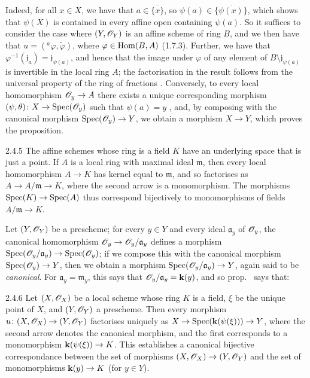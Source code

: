 \documentclass{book}
\begin{document}
Indeed, for all $x\in X$, we have that $a\in\overline{\{x\}}$, so
$\psi(a)\in\overline{\{\psi(x)\}}$, which shows that $\psi(X)$ is contained in
every affine open containing $\psi(a)$. So it suffices to consider the case
where $(Y,\mathscr{O}_Y)$ is an affine scheme of ring $B$, and we then have that
$u=(^a\varphi,\tilde{\varphi})$, where $\varphi\in{\mathop{\mathrm{Hom}}\nolimits}(B,A)$ (1.7.3).  Further,
we have that $\varphi^{-1}(\mathfrak{j}_a)=\mathfrak{j}_{\psi(a)}$, and hence
that the image under $\varphi$ of any element of
$B\setminus\mathfrak{j}_{\psi(a)}$ is invertible in the local ring $A$; the
factorisation in the result follows from the universal property of the ring of
fractions . Conversely, to every local homomorphism
$\mathscr{O}_y\to A$ there exists a unique corresponding morphism
$(\psi,\theta)\colon X\to{\mathop{\mathrm{Spec}}\nolimits}(\mathscr{O}_y)$ such that $\psi(a)=y$ , and,
by composing with the canonical morphism ${\mathop{\mathrm{Spec}}\nolimits}(\mathscr{O}_y)\to Y$, we obtain a morphism
$X\to Y$, which proves the proposition.
    
\begin{env}{2.4.5}
\label{env-1.2.4.5}
The affine schemes whose ring is a field $K$ have an
underlying space that is just a point. If $A$ is a local ring with maximal
ideal $\mathfrak{m}$, then every local homomorphism $A\to K$ has kernel equal to
$\mathfrak{m}$, and so factorises as $A\to A/\mathfrak{m}\to K$, where the
second arrow is a monomorphism. The morphisms ${\mathop{\mathrm{Spec}}\nolimits}(K)\to{\mathop{\mathrm{Spec}}\nolimits}(A)$ thus
correspond bijectively to monomorphisms of fields $A/\mathfrak{m}\to K$.
\end{env}
    
Let $(Y,\mathscr{O}_Y)$ be a prescheme; for every $y\in Y$ and every ideal
$\mathfrak{a}_y$ of $\mathscr{O}_y$, the canonical homomorphism
$\mathscr{O}_y\to\mathscr{O}_y/\mathfrak{a}_y$ defines a morphism
${\mathop{\mathrm{Spec}}\nolimits}(\mathscr{O}_y/\mathfrak{a}_y)\to{\mathop{\mathrm{Spec}}\nolimits}(\mathscr{O}_y)$; if we compose this with the
canonical morphism ${\mathop{\mathrm{Spec}}\nolimits}(\mathscr{O}_y)\to Y$, then we obtain a morphism
${\mathop{\mathrm{Spec}}\nolimits}(\mathscr{O}_y/\mathfrak{a}_y)\to Y$, again said to be \textit{canonical}. For
$\mathfrak{a}_y=\mathfrak{m}_y$, this says that $\mathscr{O}_y/\mathfrak{a}_y=\mathbf{k}(y)$, and
so prop.~ says that:
    
\begin{envs}[Corollary]{2.4.6}
\label{cor-1.2.4.6}
Let $(X,\mathscr{O}_X)$ be a local scheme
whose ring $K$ is a field, $\xi$ be the unique point of $X$, and $(Y,\mathscr{O}_Y)$ a
prescheme. Then every morphism $u\colon(X,\mathscr{O}_X)\to(Y,\mathscr{O}_Y)$ factorises uniquely
as $X\to{\mathop{\mathrm{Spec}}\nolimits}(\mathbf{k}(\psi(\xi)))\to Y$, where the second arrow denotes the canonical
morphism, and the first corresponds to a monomorphism $\mathbf{k}(\psi(\xi))\to K$.
This establishes a canonical bijective correspondance between the set of
morphisms $(X,\mathscr{O}_X)\to (Y,\mathscr{O}_Y)$ and the set of monomorphisms $\mathbf{k}(y)\to K$ (for
$y\in Y$).
\end{envs}
    
\end{document}
